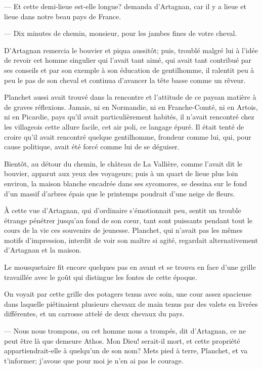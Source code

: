 — Et cette demi-lieue est-elle longue? demanda d'Artagnan, car il y a lieue et lieue dans notre beau pays de France.

— Dix minutes de chemin, monsieur, pour les jambes fines de votre cheval.

D'Artagnan remercia le bouvier et piqua aussitôt; puis, troublé malgré lui à l'idée de revoir cet homme singulier qui l'avait tant aimé, qui avait tant contribué par ses conseils et par son exemple à son éducation de gentilhomme, il ralentit peu à peu le pas de son cheval et continua d'avancer la tête basse comme un rêveur.

Planchet aussi avait trouvé dans la rencontre et l'attitude de ce paysan matière à de graves réflexions. Jamais, ni en Normandie, ni en Franche-Comté, ni en Artois, ni en Picardie, pays qu'il avait particulièrement habités, il n'avait rencontré chez les villageois cette allure facile, cet air poli, ce langage épuré. Il était tenté de croire qu'il avait rencontré quelque gentilhomme, frondeur comme lui, qui, pour cause politique, avait été forcé comme lui de se déguiser.

Bientôt, au détour du chemin, le château de La Vallière, comme l'avait dit le bouvier, apparut aux yeux des voyageurs; puis à un quart de lieue plus loin environ, la maison blanche encadrée dans ses sycomores, se dessina sur le fond d'un massif d'arbres épais que le printemps poudrait d'une neige de fleurs.

À cette vue d'Artagnan, qui d'ordinaire s'émotionnait peu, sentit un trouble étrange pénétrer jusqu'au fond de son cœur, tant sont puissants pendant tout le cours de la vie ces souvenirs de jeunesse. Planchet, qui n'avait pas les mêmes motifs d'impression, interdit de voir son maître si agité, regardait alternativement d'Artagnan et la maison.

Le mousquetaire fit encore quelques pas en avant et se trouva en face d'une grille travaillée avec le goût qui distingue les fontes de cette époque.

On voyait par cette grille des potagers tenus avec soin, une cour assez spacieuse dans laquelle piétinaient plusieurs chevaux de main tenus par des valets en livrées différentes, et un carrosse attelé de deux chevaux du pays.

— Nous nous trompons, ou cet homme nous a trompés, dit d'Artagnan, ce ne peut être là que demeure Athos. Mon Dieu! serait-il mort, et cette propriété appartiendrait-elle à quelqu'un de son nom? Mets pied à terre, Planchet, et va t'informer; j'avoue que pour moi je n'en ai pas le courage.

